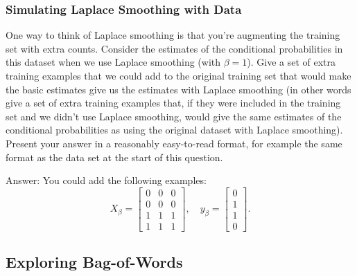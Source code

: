 \documentclass{article}
\def\ans#1{\par\gre{Answer: #1}}
\def\blu#1{{\color{blu}#1}}
\def\gre#1{{\color{gre}#1}}
\begin{document}
	\subsubsection{Simulating Laplace Smoothing with Data}
	\label{laplace.conceptual}
	
	One way to think of Laplace smoothing is that you're augmenting the training set with extra counts. Consider the estimates of the conditional probabilities in this dataset when we use Laplace smoothing (with $\beta = 1$). 
	\blu{Give a set of extra training examples that we could add to the original training set that would make the basic estimates give us the estimates with Laplace smoothing} (in other words give a set of extra training examples that, if they were included in the training set and we didn't use Laplace smoothing, would give the same estimates of the conditional probabilities as using the original dataset with Laplace smoothing).
	Present your answer in a reasonably easy-to-read format, for example the same format as the data set at the start of this question.
	
	\ans{
		You could add the following examples:
		\[
		X_\beta = \begin{bmatrix}0 & 0 & 0\\ 0 & 0 & 0 \\ 1 & 1 & 1 \\ 1 & 1 & 1\end{bmatrix}, \quad y_\beta = \begin{bmatrix}0 \\ 1 \\ 1 \\ 0\end{bmatrix}.
		\]
	}
	
	\subsection{Exploring Bag-of-Words}
	
\end{document}
